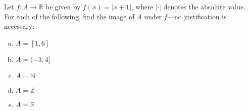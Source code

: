 \documentclass[11pt,letterpaper]{article}
\begin{document}
\newpage



 Let $f: A \to \mathbb{R}$ be given by $f(x)= |x + 1|$, where $| \cdot |$ denotes the absolute value. For each of the following, find the image of $A$ under $f$---no justification is necessary: 
	\begin{enumerate}[(a)]
	\item $A= [1, 6]$
	\item $A= (-3, 4]$
	\item $A= \mathbb{N}$
	\item $A= \mathbb{Z}$
	\item $A= \mathbb{R}$
	\end{enumerate}
\end{document}
